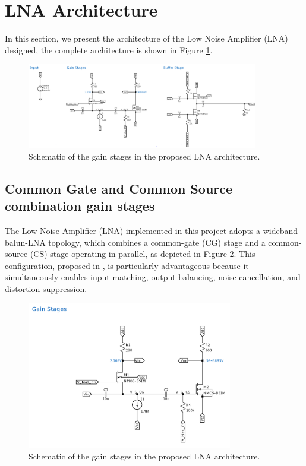 \section{LNA Architecture}

In this section, we present the architecture of the Low Noise Amplifier (LNA) designed, the complete architecture is shown in Figure \ref{fig:schem-lna}. 

\begin{figure}[H]
    \centering
    \includegraphics[width=0.9\textwidth]{Images/schem-LNA.png}
    \caption{Schematic of the gain stages in the proposed LNA architecture.}
    \label{fig:schem-lna}
\end{figure}

\subsection{Common Gate and Common Source combination gain stages}

The Low Noise Amplifier (LNA) implemented in this project adopts a wideband balun-LNA topology, which combines a common-gate (CG) stage and a common-source (CS) stage operating in parallel, as depicted in Figure \ref{fig:schem-gain-stages}. This configuration, proposed in \cite{Blaakmeer2008}, is particularly advantageous because it simultaneously enables input matching, output balancing, noise cancellation, and distortion suppression.

\begin{figure}[H]
    \centering
    \includegraphics[width=0.8\textwidth]{Images/schem-GainStages.png}
    \caption{Schematic of the gain stages in the proposed LNA architecture.}
    \label{fig:schem-gain-stages}
\end{figure}

